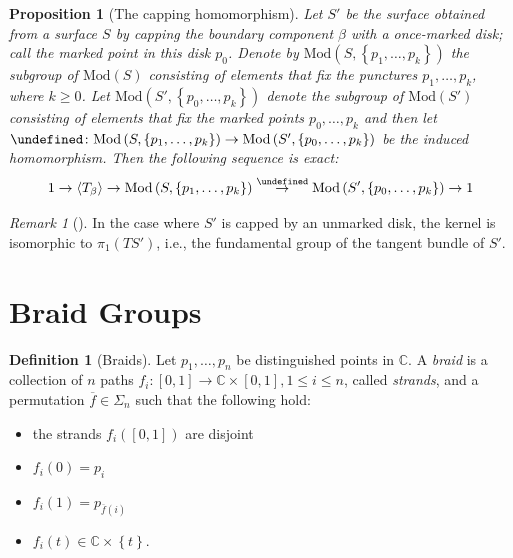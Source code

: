 \documentclass[reqno]{amsart}
\newtheorem{proposition}[theorem]{Proposition}
\theoremstyle{definition}
\newtheorem{definition}[theorem]{Definition}
\theoremstyle{remark}
\newtheorem*{remark}{Remark}
\newcommand{\Mod}{{\mathrm{Mod}}}
\let\Cap\undefined
\newcommand{\Cap}{{\mathcal{C}}ap}
\begin{document}
\begin{proposition}[The capping homomorphism]
    Let $S'$ be the surface obtained from a surface
    $S$ by capping the boundary component $\beta $ with
    a once-marked disk; call the marked point in this disk
    $p_0$. Denote by 
    $\Mod \left( S, \left\{ p_1, \ldots, p_k \right\}  \right) $ 
    the subgroup of $\Mod(S)$ consisting of elements
    that fix the punctures $p_1, \ldots, p_k$, where
    $k \ge 0$. Let
    $\Mod \left( S', \left\{ p_0, \ldots, p_k \right\}  \right) $ 
    denote the subgroup of $\Mod(S')$ consisting
    of elements that fix the marked points
    $p_0, \ldots, p_k$ and then let
    $\Cap \colon \Mod \left( S, \left\{ p_1, \ldots,
    p_k \right\}  \right) \to \Mod \left( S',
    \left\{ p_0, \ldots, p_k \right\} \right) $ be the
    induced homomorphism. Then the following
    sequence is exact:
    \[
    1 \to 
    \left<T_{\beta} \right>
    \to \Mod \left( S, \left\{ p_1, \ldots, p_k \right\}  \right) 
    \stackrel{\Cap}{\to}  
    \Mod \left( S', \left\{ p_0, \ldots, p_k \right\}  \right) 
    \to 1
    \] 
\end{proposition}

\begin{remark}[]
In the case where $S'$ is capped by an
unmarked disk, the kernel is isomorphic to 
$\pi_1 \left( TS' \right) $, i.e., the fundamental group
of the tangent bundle of $S'$.
\end{remark}



\section{Braid Groups}


\begin{definition}[Braids]
    Let $p_1, \ldots, p_n$ be distinguished points
    in $\mathbb{C}$. A \textit{braid} is a collection
    of $n$ paths $f_i \colon \left[ 0,1 \right] 
    \to \mathbb{C} \times \left[ 0,1 \right] , 1\le i \le n$,
    called \textit{strands}, and a
    permutation $\overline{f}
    \in \Sigma_n$ such that the following hold:
    \begin{itemize}
        \item the strands 
            $f_i \left( \left[ 0,1 \right]  \right) $ are
            disjoint
        \item $f_i (0) = p_i$ 
        \item $f_i (1) = p_{\overline{f}(i)}$ 
        \item $f_i (t) \in \mathbb{C} \times \left\{ t \right\} $.
    \end{itemize}
\end{definition}
\end{document}
